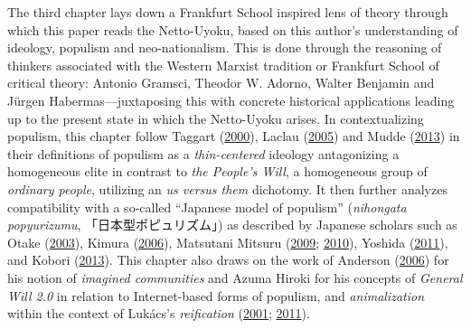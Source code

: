 \documentclass[10pt,british,A4paper,,openany]{memoir}
\begin{document}
The third chapter lays down a Frankfurt School inspired lens of theory
through which this paper reads the Netto-Uyoku, based on this author's
understanding of ideology, populism and neo-nationalism. This is done
through the reasoning of thinkers associated with the Western Marxist
tradition or Frankfurt School of critical theory: Antonio Gramsci,
Theodor W. Adorno, Walter Benjamin and Jürgen Habermas---juxtaposing
this with concrete historical applications leading up to the present
state in which the Netto-Uyoku arises. In contextualizing populism, this
chapter follow Taggart
(\protect\hyperlink{ref-taggart_populism_2000}{2000}), Laclau
(\protect\hyperlink{ref-laclau_populist_2005}{2005}) and Mudde
(\protect\hyperlink{ref-mudde_oxford_2013}{2013}) in their definitions
of populism as a \emph{thin-centered} ideology antagonizing a
homogeneous elite in contrast to \emph{the People's Will}, a homogeneous
group of \emph{ordinary people}, utilizing an \emph{us versus them}
dichotomy. It then further analyzes compatibility with a so-called
``Japanese model of populism'' (\emph{nihongata popyurizumu},
「日本型ポピュリズム」) as described by Japanese scholars such as Otake
(\protect\hyperlink{ref-otake__2003}{2003}), Kimura
(\protect\hyperlink{ref-kimura__2006}{2006}), Matsutani Mitsuru
(\protect\hyperlink{ref-matsutani__2009}{2009};
\protect\hyperlink{ref-matsutani_eng:_2010}{2010}), Yoshida
(\protect\hyperlink{ref-yoshida__2011}{2011}), and Kobori
(\protect\hyperlink{ref-kobori_populism_2013}{2013}). This chapter also
draws on the work of Anderson
(\protect\hyperlink{ref-anderson_imagined_2006}{2006}) for his notion of
\emph{imagined communities} and Azuma Hiroki for his concepts of
\emph{General Will 2.0} in relation to Internet-based forms of populism,
and \emph{animalization} within the context of Lukács's
\emph{reification} (\protect\hyperlink{ref-azuma_otaku:_2001}{2001};
\protect\hyperlink{ref-azuma_ippan_2011}{2011}).
\end{document}
